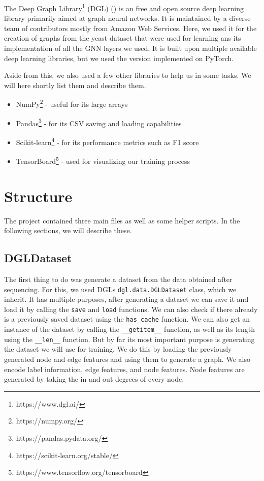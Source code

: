 \documentclass[times, utf8, diplomski, english]{fer_eng}
\begin{document}
The Deep Graph Library\footnote{https://www.dgl.ai/} (DGL) (\cite{DGL}) is an free and open source deep learning library primarily aimed at graph neural networks. It is maintained by a diverse team of contributors mostly from Amazon Web Services. Here, we used it for the creation of graphs from the yeast dataset that were used for learning ans its implementation of all the GNN layers we used. It is built upon multiple available deep learning libraries, but we used the version implemented on PyTorch.

Aside from this, we also used a few other libraries to help us in some tasks. We will here shortly list them and describe them.

\begin{itemize}
	\item NumPy\footnote{https://numpy.org/} - useful for its large arrays
	\item Pandas\footnote{https://pandas.pydata.org/} - for its CSV saving and loading capabilities
	\item Scikit-learn\footnote{https://scikit-learn.org/stable/} - for its performance metrics such as F1 score
	\item TensorBoard\footnote{https://www.tensorflow.org/tensorboard} - used for visualizing our training process
\end{itemize}

\section{Structure}

The project contained three main files as well as some helper scripts. In the following sections, we will describe these.

\subsection{DGLDataset}

The first thing to do was generate a dataset from the data obtained after sequencing. For this, we used DGLs \texttt{dgl.data.DGLDataset} class, which we inherit. It has multiple purposes, after generating a dataset we can save it and load it by calling the \texttt{save} and \texttt{load} functions. We can also check if there already is a previously saved dataset using the \texttt{has\_cache} function. We can also get an instance of the dataset by calling the \texttt{\_\_getitem\_\_} function, as well as its length using the \texttt{\_\_len\_\_} function. But by far its most important purpose is generating the dataset we will use for training. We do this by loading the previously generated node and edge features and using them to generate a graph. We also encode label information, edge features, and node features. Node features are generated by taking the in and out degrees of every node.
\end{document}
